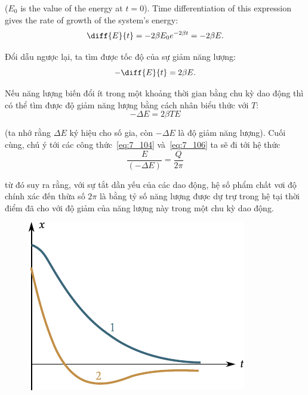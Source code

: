 \noindent
($E_0$ is the value of the energy at $t=0$). Time differentiation of this expression gives the rate of growth of the system's energy:
\begin{equation*}
	\diff{E}{t} = -2\beta E_0 e^{-2\beta t} = -2\beta E.
\end{equation*}

\noindent
Đổi dẫu ngược lại, ta tìm được tốc độ của sự giảm năng lượng:
\begin{equation}\label{eq:7_108}
	-\diff{E}{t} = 2\beta E.
\end{equation}

\noindent
Nếu năng lượng biến đổi ít trong một khoảng thời gian bằng chu kỳ dao động thì có thể tìm được độ giảm năng lượng bằng cách nhân biểu thức  với $T$:
\begin{equation*}
	-\Delta E = 2\beta T E
\end{equation*}

\noindent
(ta nhớ rằng $\Delta E$ ký hiệu cho số gia, còn $-\Delta E$ là độ giảm năng lượng). Cuối cùng, chú ý tới các công thức~\eqref{eq:7_104} và~\eqref{eq:7_106} ta sẽ đi tới hệ thức
\begin{equation}\label{eq:7_109}
	\frac{E}{(-\Delta E)} = \frac{Q}{2\pi}
\end{equation}

\noindent
từ đó suy ra rằng, với sự tắt dần yếu của các dao động, hệ số phẩm chất vơi độ chính xác đến thừa số $2\pi$ là bằng tỷ số năng lượng được dự trự trong hệ tại thời điểm đã cho với độ giảm của năng lượng này trong một chu kỳ dao động.

\begin{figure}[!htbt]
	\begin{center}
		\includegraphics[scale=0.95]{figures/ch_07/fig_7_20.pdf}
		\caption[]{}
		\label{fig:7_20}
	\end{center}
	\vspace{-0.8cm}
\end{figure}

